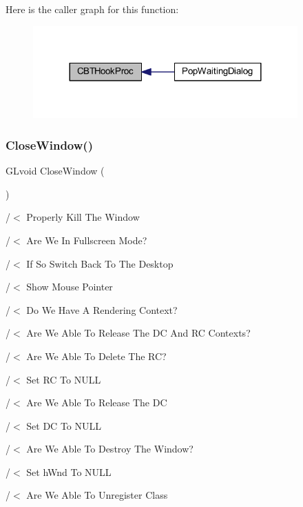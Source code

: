Here is the caller graph for this function\+:\nopagebreak
\begin{figure}[H]
\begin{center}
\leavevmode
\includegraphics[width=288pt]{supportcode_8cpp_a17f99e323714d00ed14865018691574c_icgraph}
\end{center}
\end{figure}
\mbox{\label{supportcode_8cpp_a4709a40ac779c9bbb341a15554eae549}} 
\subsubsection{Close\+Window()}
{\footnotesize\ttfamily G\+Lvoid Close\+Window (\begin{DoxyParamCaption}\item[{G\+Lvoid}]{ }\end{DoxyParamCaption})}



/$<$ Properly Kill The Window 

/$<$ Are We In Fullscreen Mode?

/$<$ If So Switch Back To The Desktop

/$<$ Show Mouse Pointer

/$<$ Do We Have A Rendering Context?

/$<$ Are We Able To Release The DC And RC Contexts?

/$<$ Are We Able To Delete The RC?

/$<$ Set RC To N\+U\+LL

/$<$ Are We Able To Release The DC

/$<$ Set DC To N\+U\+LL

/$<$ Are We Able To Destroy The Window?

/$<$ Set h\+Wnd To N\+U\+LL

/$<$ Are We Able To Unregister Class

